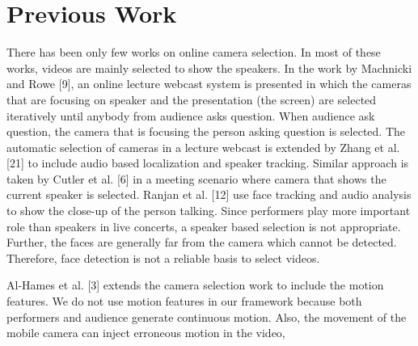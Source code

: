 \documentclass{sig-alternate}
\begin{document}
\section{Previous Work}
There has been only few works on online camera selection. In
most of these works, videos are mainly selected to show the speakers.
In the work by Machnicki and Rowe [9], an online lecture
webcast system is presented in which the cameras that are focusing
on speaker and the presentation (the screen) are selected iteratively
until anybody from audience asks question. When audience ask
question, the camera that is focusing the person asking question is
selected. The automatic selection of cameras in a lecture webcast
is extended by Zhang et al. [21] to include audio based localization
and speaker tracking. Similar approach is taken by Cutler et al. [6]
in a meeting scenario where camera that shows the current speaker
is selected. Ranjan et al. [12] use face tracking and audio analysis
to show the close-up of the person talking. Since performers
play more important role than speakers in live concerts, a speaker
based selection is not appropriate. Further, the faces are generally
far from the camera which cannot be detected. Therefore, face detection
is not a reliable basis to select videos.

Al-Hames et al. [3] extends the camera selection work to include
the motion features. We do not use motion features in our framework
because both performers and audience generate continuous
motion. Also, the movement of the mobile camera can inject erroneous motion in the video,  
\end{document}

